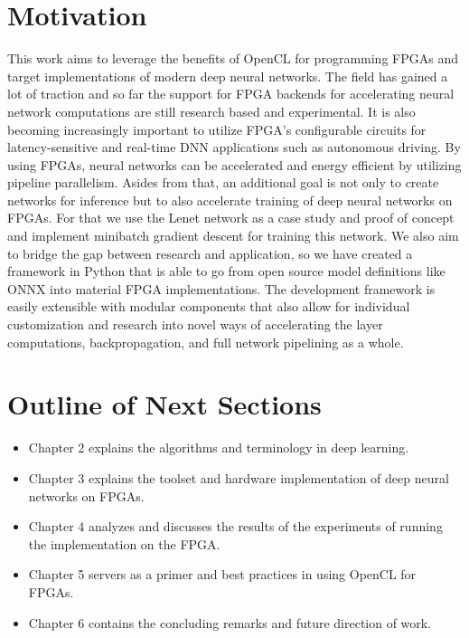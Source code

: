 \section{Motivation}

This work aims to leverage the benefits of OpenCL for programming FPGAs and target implementations of modern deep neural networks. The field has gained a lot of traction and so far the support for FPGA backends for accelerating neural network computations are still research based and experimental. It is also becoming increasingly important to utilize FPGA's configurable circuits for latency-sensitive and real-time DNN applications such as autonomous driving. By using FPGAs, neural networks can be accelerated and energy efficient by utilizing pipeline parallelism. Asides from that, an additional goal is not only to create networks for inference but to also accelerate training of deep neural networks on FPGAs. For that we use the Lenet network as a case study and proof of concept and implement minibatch gradient descent for training this network. We also aim to bridge the gap between research and application, so we have created a framework in Python that is able to go from open source model definitions like ONNX \cite{onnx} into material FPGA implementations. The development framework is easily extensible with modular components that also allow for individual customization and research into novel ways of accelerating the layer computations, backpropagation, and full network pipelining as a whole. 


\section{Outline of Next Sections}

\begin{itemize}

\item Chapter 2 explains the algorithms and terminology in deep learning. 

\item Chapter 3 explains the toolset and hardware implementation of deep neural networks on FPGAs.

\item Chapter 4 analyzes and discusses the results of the experiments of running the implementation on the FPGA.

\item Chapter 5 servers as a primer and best practices in using OpenCL for FPGAs.

\item Chapter 6 contains the concluding remarks and future direction of work.

\end{itemize}


